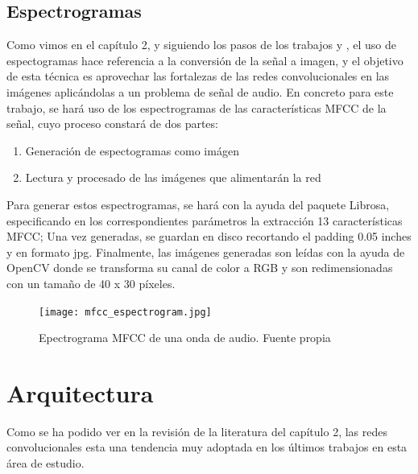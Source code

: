 \documentclass[11pt,a4paper,spanish]{book}
\begin{document}
	\subsection{Espectrogramas}
	Como vimos en el capítulo 2, y siguiendo los pasos de los trabajos \cite{Anvarjon2020} y \cite{Mustaqeem2020}, el uso de espectogramas hace referencia a la conversión de la señal a imagen, y el objetivo de esta técnica es aprovechar las fortalezas de las redes convolucionales en las imágenes aplicándolas a un problema de señal de audio. En concreto para este trabajo, se hará uso de los espectrogramas de las características MFCC de la señal, cuyo proceso constará de dos partes: 
	\begin{enumerate}
		\item Generación de espectogramas como imágen
		\item Lectura y procesado de las imágenes que alimentarán la red
	\end{enumerate}

	Para generar estos espectrogramas, se hará con la ayuda del paquete Librosa, especificando en los correspondientes parámetros la extracción 13 características MFCC; Una vez generadas, se guardan en disco recortando el padding 0.05 inches y en formato jpg.
	Finalmente, las imágenes generadas son leídas con la ayuda de OpenCV donde se transforma su canal de color a RGB y son redimensionadas con un tamaño de 40 x 30 píxeles.
	
	\begin{figure}[H]
		\centering
		\texttt{[image: mfcc\_espectrogram.jpg]} 
		\caption{Epectrograma MFCC de una onda de audio. Fuente propia}
		\label{fig:mfcc_sample}
	\end{figure}
	
	
	\section{Arquitectura}
	\label{sec:arquitectura_cap4}
	Como se ha podido ver en la revisión de la literatura del capítulo 2, las redes convolucionales esta una tendencia muy adoptada en los últimos trabajos en esta área de estudio.
	
	
\end{document}
